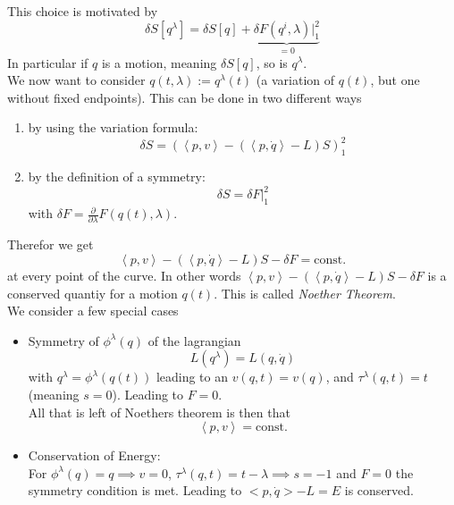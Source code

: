 \documentclass{report}
\begin{document}
This choice is motivated by \[
  \delta S[q^\lambda] = \delta S [q] + \underbrace{\delta F\left( q^i, \lambda \right)|_1^2}_{=0}
\] In particular if $q$ is a motion, meaning $\delta S[q]$, so is $q^\lambda$.\\
We now want to consider $q\left( t, \lambda \right) := q^\lambda\left( t \right) $ (a variation of $q\left( t \right) $, but one without fixed endpoints). This can be done in two different ways
\begin{enumerate}
  \item by using the variation formula: \[
      \delta S = \left( \left< p,v \right>  -\left( \left< p, \dot{q} \right>  - L \right) S \right)_1^2
  \] 
\item by the definition of  a symmetry: \[
\delta S = \delta F|_1^2
\] with $\delta F = \frac{\partial }{\partial \lambda} F\left( q\left( t \right) , \lambda \right) $.
\end{enumerate}
Therefor we get \[
  \left< p,v \right>  - \left( \left< p, \dot{q} \right>  - L \right)S - \delta F = \text{const.}
\] at every point of the curve. In other words $\left< p,v \right> - \left( \left< p, \dot{q} \right>  - L \right)S - \delta F$ is a conserved quantiy for a motion $q\left( t \right) $. This is called \emph{Noether Theorem}. \\
We consider a few special cases
\begin{itemize}
  \item Symmetry of $\phi^\lambda\left( q \right) $ of the lagrangian \[
      L\left( q^\lambda \right) = L\left( q, \dot{q} \right) 
    \] with $q^\lambda = \phi^\lambda\left( q\left( t \right)  \right) $ leading to an $v\left( q,t \right) = v\left( q \right) $, and $\tau^\lambda\left( q,t \right) = t$ (meaning $s = 0$). Leading to $F = 0$.  \\
  All that is left of Noethers theorem is then that \[
  \left< p,v \right>  = \text{const.}
  \] 
\item Conservation of Energy:\\
  For $\phi^\lambda\left( q \right) = q \implies v = 0$, $\tau^\lambda\left( q,t \right) = t - \lambda \implies s = -1$ and $F = 0$ the symmetry condition is met.
  Leading to $<p, \dot{q}> - L = E$ is conserved.
\end{itemize}
\end{document}
